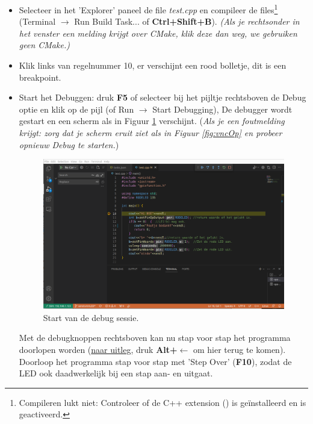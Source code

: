 \begin{enumerate}
\begin{itemize}
	\item Selecteer in het 'Explorer' paneel de file \textit{test.cpp} en compileer de files\footnote{Compileren lukt niet: Controleer of de C++ extension () is geïnstalleerd en is geactiveerd.} (Terminal $\rightarrow$ Run Build Task... of \textbf{Ctrl+Shift+B}). \textit{(Als je rechtsonder in het venster een melding krijgt over CMake, klik deze dan weg, we gebruiken geen CMake.)}
	\item Klik links van regelnummer 10, er verschijnt een rood bolletje, dit is een breakpoint.
	\item Start het Debuggen: druk \textbf{F5} of selecteer bij het pijltje rechtsboven  de Debug optie en klik op de pijl (of Run $\rightarrow$ Start Debugging), De debugger wordt gestart en een scherm als in Figuur \ref{fig:debugScherm} verschijnt. (\textit{Als je een foutmelding krijgt: zorg dat je scherm eruit ziet als in Figuur \ref{fig:vncOp} en probeer opnieuw Debug te starten.})
	\begin{figure}[h!]
		\centering
		\begin{center} 	
			\includegraphics[width=1\textwidth]{figuren/debugScherm} %
			\caption{Start van de debug sessie.}
			\label{fig:debugScherm}   
		\end{center}
	\end{figure}
	
	Met de debugknoppen rechtsboven kan nu stap voor stap het programma doorlopen worden (\hyperlink{chp:debugknoppen}{naar uitleg}, druk \textbf{Alt+$\leftarrow$} om hier terug te komen).\\
	Doorloop het programma stap voor stap met 'Step Over' (\textbf{F10}), zodat de LED ook daadwerkelijk bij een stap aan- en uitgaat. 
\end{itemize}


\end{enumerate}
